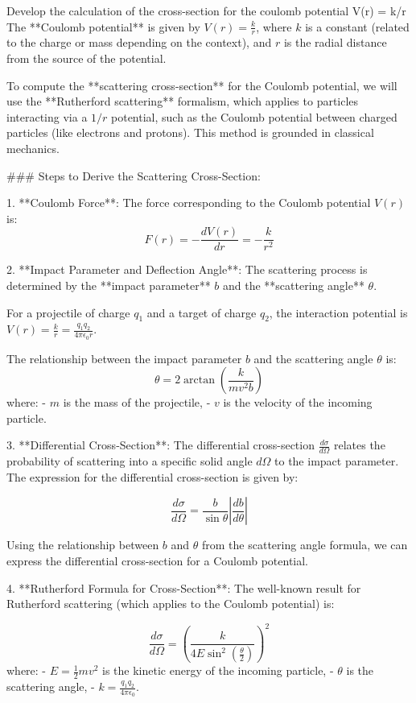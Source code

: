 Develop the calculation of the cross-section for the coulomb potential V(r) = k/r
The **Coulomb potential** is given by \( V(r) = \frac{k}{r} \), where \( k \) is a constant (related to the charge or mass depending on the context), and \( r \) is the radial distance from the source of the potential.

To compute the **scattering cross-section** for the Coulomb potential, we will use the **Rutherford scattering** formalism, which applies to particles interacting via a \( 1/r \) potential, such as the Coulomb potential between charged particles (like electrons and protons). This method is grounded in classical mechanics.

### Steps to Derive the Scattering Cross-Section:

1. **Coulomb Force**:
   The force corresponding to the Coulomb potential \( V(r) \) is:
   \[
   F(r) = -\frac{dV(r)}{dr} = -\frac{k}{r^2}
   \]

2. **Impact Parameter and Deflection Angle**:
   The scattering process is determined by the **impact parameter** \( b \) and the **scattering angle** \( \theta \).

   For a projectile of charge \( q_1 \) and a target of charge \( q_2 \), the interaction potential is \( V(r) = \frac{k}{r} = \frac{q_1 q_2}{4 \pi \epsilon_0 r} \).

   The relationship between the impact parameter \( b \) and the scattering angle \( \theta \) is:
   \[
   \theta = 2 \arctan\left( \frac{k}{mv^2 b} \right)
   \]
   where:
   - \( m \) is the mass of the projectile,
   - \( v \) is the velocity of the incoming particle.

3. **Differential Cross-Section**:
   The differential cross-section \( \frac{d\sigma}{d\Omega} \) relates the probability of scattering into a specific solid angle \( d\Omega \) to the impact parameter. The expression for the differential cross-section is given by:

   \[
   \frac{d\sigma}{d\Omega} = \frac{b}{\sin\theta} \left| \frac{db}{d\theta} \right|
   \]

   Using the relationship between \( b \) and \( \theta \) from the scattering angle formula, we can express the differential cross-section for a Coulomb potential.

4. **Rutherford Formula for Cross-Section**:
   The well-known result for Rutherford scattering (which applies to the Coulomb potential) is:

   \[
   \frac{d\sigma}{d\Omega} = \left( \frac{k}{4 E \sin^2\left(\frac{\theta}{2}\right)} \right)^2
   \]
   where:
   - \( E = \frac{1}{2} mv^2 \) is the kinetic energy of the incoming particle,
   - \( \theta \) is the scattering angle,
   - \( k = \frac{q_1 q_2}{4 \pi \epsilon_0} \).

